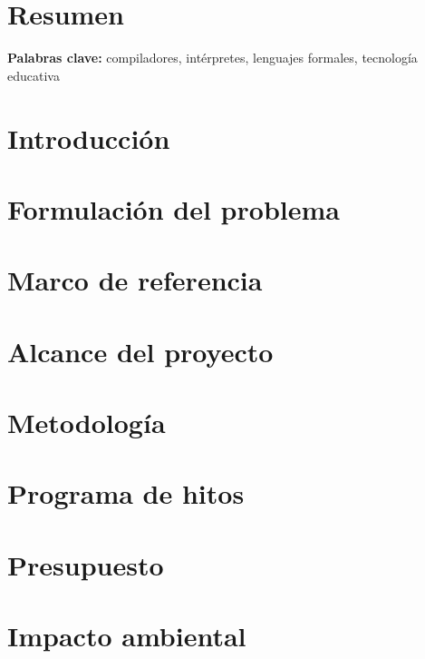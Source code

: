 \documentclass[12pt,oneside]{report}
\begin{document}
\portada
\contraportada
{}

\tableofcontents
\newpage
{}

\chapter*{Resumen}



\vspace{1cm}

\textbf{Palabras clave:} compiladores, intérpretes, lenguajes formales, tecnología educativa

\newpage


\chapter{Introducción}


\chapter{Formulación del problema}


\chapter{Marco de referencia}


\chapter{Alcance del proyecto}


\chapter{Metodología}

\chapter{Programa de hitos}

  
\chapter{Presupuesto}


\chapter{Impacto ambiental}







\end{document}
